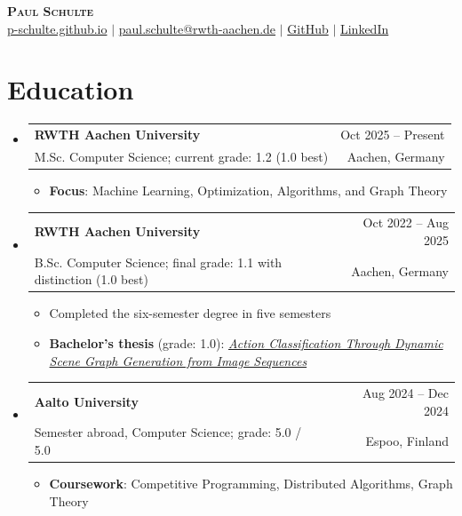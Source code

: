 \documentclass[letterpaper,11pt]{article}
\makeatletter
\newcommand{\resumeItem}[1]{
  \item\small{
    {#1 \vspace{-3pt}}
  }
}
\newcommand{\resumeSubheading}[4]{
  \vspace{-2pt}\item
    \begin{tabular*}{0.97\textwidth}[t]{l@{\extracolsep{\fill}}r}
      #1 & #2 \\
      \small#3 & \small#4
    \end{tabular*}\vspace{-8pt}
}
\newcommand{\resumeSubHeadingListStart}{\begin{itemize}[leftmargin=0.15in, label={}]}
\newcommand{\resumeSubHeadingListEnd}{\end{itemize}}
\newcommand{\resumeItemListStart}{\begin{itemize}}
\newcommand{\resumeItemListEnd}{\end{itemize}\vspace{-7pt}}
\makeatother
\begin{document}
\begin{center}
    \textbf{\Huge \scshape Paul Schulte} \\ \vspace{2pt}
    \small
    \href{https://p-schulte.github.io}{p-schulte.github.io} 
    $|$ 
    \href{mailto:paul.schulte@rwth-aachen.de}{paul.schulte@rwth-aachen.de}
    $|$ 
    \href{https://github.com/p-schulte}{GitHub}
    $|$ 
    \href{https://www.linkedin.com/in/paul-schulte-607085218/}{LinkedIn}
\end{center}

%

\section{Education}

\resumeSubHeadingListStart
\resumeSubheading
    {\textbf{RWTH Aachen University}}{Oct 2025 -- Present}
    {M.Sc. Computer Science; current grade: 1.2 (1.0 best)}{Aachen, Germany}
\resumeItemListStart
    \resumeItem{\textbf{Focus}: Machine Learning, Optimization, Algorithms, and Graph Theory}
\resumeItemListEnd

\resumeSubheading
    {\textbf{RWTH Aachen University}}{Oct 2022 -- Aug 2025}
    {B.Sc. Computer Science; final grade: 1.1 with distinction (1.0 best)}{Aachen, Germany}
\resumeItemListStart
    \resumeItem{Completed the six-semester degree in five semesters}
    \resumeItem{\textbf{Bachelor's thesis} (grade: 1.0): \href{https://ml.rwth-aachen.de//theses/schulte2025.pdf}{\textit{Action Classification Through Dynamic Scene Graph Generation from Image Sequences}}}
\resumeItemListEnd

\resumeSubheading
    {\textbf{Aalto University}}{Aug 2024 -- Dec 2024}
    {Semester abroad, Computer Science; grade: 5.0 / 5.0}{Espoo, Finland}
\resumeItemListStart
    \resumeItem{\textbf{Coursework}: Competitive Programming, Distributed Algorithms, Graph Theory}
\resumeItemListEnd
\resumeSubHeadingListEnd
\end{document}
